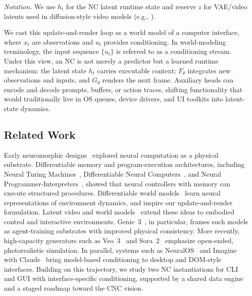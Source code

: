 \noindent\textit{Notation.} We use $h_t$ for the NC latent runtime state and reserve $z$ for VAE/video latents used in diffusion-style video models (e.g., ). 

We cast this update-and-render loop as a world model of a computer interface, where $x_t$ are observations and $u_t$ provides conditioning.
In world-modeling terminology, the input sequence $\{u_t\}$ is referred to as a conditioning stream.
Under this view, an NC is not merely a predictor but a learned runtime mechanism: the latent state $h_t$ carries executable context; $F_\theta$ integrates new observations and inputs, and $G_\theta$ renders the next frame.
Auxiliary heads can encode and decode prompts, buffers, or action traces, shifting functionality that would traditionally live in OS queues, device drivers, and UI toolkits into latent-state dynamics.

\subsection{Related Work}
\label{section:prelim-related}

Early neuromorphic designs~\citep{mead2012analog} explored neural computation as a physical substrate.
Differentiable memory and program-execution architectures, including Neural Turing Machines~\citep{graves2014neural},
Differentiable Neural Computers~\citep{graves2016hybrid}, and Neural Programmer-Interpreters~\citep{reed2015neural}, showed that neural controllers with memory can execute structured procedures.
Differentiable world models~\citep{schmidhuber1990making,schmidhuber2015learning} learn neural representations of environment dynamics, and inspire our update-and-render formulation.
%
Latent video and world models~\citep{ha2018world,hafner2019learning,hafner2019dream,bruce2024genie} extend these ideas to embodied control and interactive environments.
Genie~3~\citep{bruce2024genie}, in particular, frames such models as agent-training substrates with improved physical consistency.
More recently, high-capacity generators such as Veo~3~\citep{google_veo3_1_2025} and Sora~2~\citep{openai_sora2_2025} emphasize open-ended, photorealistic simulation.
In parallel, systems such as NeuralOS~\citep{rivard2025neuralos} and Imagine with Claude~\citep{anthropic_claude_sonnet4_5_2025} bring model-based conditioning to desktop and DOM-style interfaces.
%
Building on this trajectory, we study two NC instantiations for CLI and GUI with interface-specific conditioning, supported by a shared data engine and a staged roadmap toward the CNC vision.
